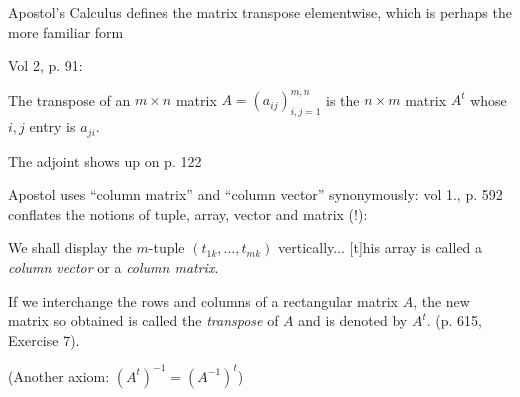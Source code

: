 Apostol's Calculus defines the matrix transpose elementwise, which is perhaps the more familiar form

Vol 2, p. 91:

The transpose of an $m \times n$ matrix $A = \left( a_{ij} \right)^{m,n}_{i,j=1}$ is the $n \times m$ matrix $A^t$ whose $i, j$ entry is $a_{ji}$.

The adjoint shows up on p. 122

Apostol uses ``column matrix'' and ``column vector'' synonymously: vol 1., p. 592 conflates the notions of tuple, array, vector and matrix (!):

We shall display the $m$-tuple $(t_{1k}, \dots, t_{mk})$ vertically... [t]his array is called a \textit{column vector} or a \textit{column matrix}.

If we interchange the rows and columns of a rectangular matrix $A$, the new matrix so obtained is called the \textit{transpose} of $A$ and is denoted by $A^t$. (p. 615, Exercise 7).

(Another axiom: $(A^t)^{-1} = (A^{-1})^t$)